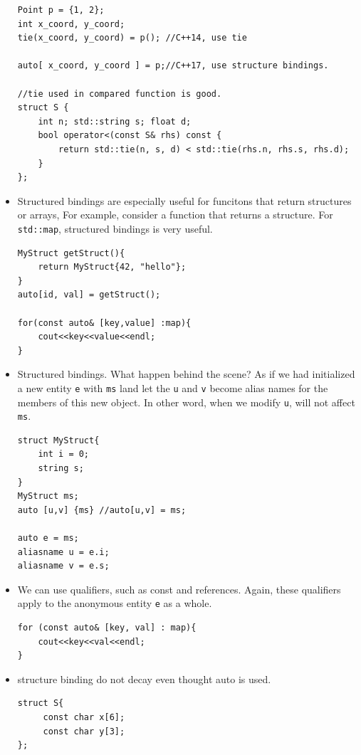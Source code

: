 \documentclass[a4paper,11pt,twoside]{book}
\begin{document}
\begin{itemize}
\begin{lstlisting}
Point p = {1, 2};
int x_coord, y_coord;
tie(x_coord, y_coord) = p(); //C++14, use tie

auto[ x_coord, y_coord ] = p;//C++17, use structure bindings. 

//tie used in compared function is good.
struct S {
    int n; std::string s; float d;
    bool operator<(const S& rhs) const {
        return std::tie(n, s, d) < std::tie(rhs.n, rhs.s, rhs.d);
    }
};
\end{lstlisting}

	\item Structured bindings are especially useful for funcitons that return structures or arrays, For example, consider a function that returns a structure. For \texttt{std::map}, structured bindings is very useful.
	
\begin{lstlisting}
MyStruct getStruct(){
	return MyStruct{42, "hello"};
}	
auto[id, val] = getStruct();

for(const auto& [key,value] :map){
	cout<<key<<value<<endl;
}
\end{lstlisting}
	
	\item Structured bindings. What happen behind the scene? As if we had initialized a new entity \texttt{e} with \texttt{ms} land let the \texttt{u} and \texttt{v} become alias names for the members of this new object. In other word, when we modify \texttt{u}, will not affect \texttt{ms}.

\begin{lstlisting}
struct MyStruct{
	int i = 0;
	string s;
}
MyStruct ms;
auto [u,v] {ms} //auto[u,v] = ms;	

auto e = ms;
aliasname u = e.i;
aliasname v = e.s;
\end{lstlisting}
	
    \item We can use qualifiers, such as const and references. Again, these qualifiers apply to the anonymous entity \texttt{e} as a whole.

\begin{lstlisting}
for (const auto& [key, val] : map){
	cout<<key<<val<<endl;
}
\end{lstlisting}	

    \item structure binding do not decay even thought auto is used. 

\begin{lstlisting}
struct S{
	 const char x[6];
	 const char y[3];
};


\end{lstlisting}
\end{itemize}
\end{document}

